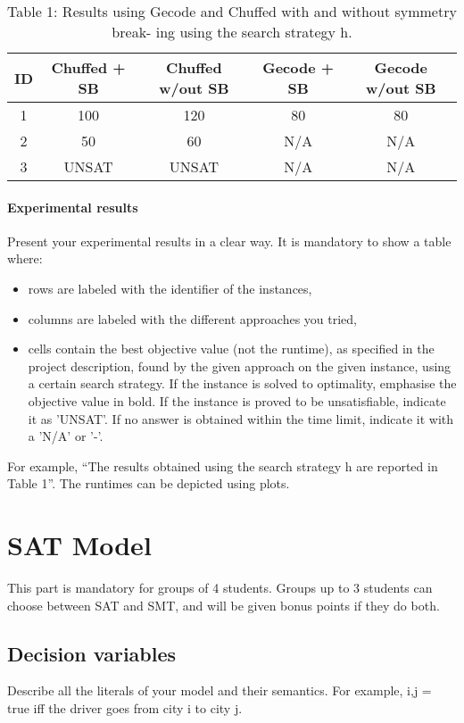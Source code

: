 \documentclass{article}
\begin{document}
\begin{table}[H]
    \centering
    \begin{tabular}{ccccc}
         ID \vline& Chuffed + SB & Chuffed w/out SB & Gecode + SB & Gecode w/out SB \\\hline
         1  \vline& 100 & 120 & 80 & 80\\
         2  \vline& 50 & 60 & N/A & N/A \\
         3  \vline& UNSAT & UNSAT & N/A & N/A \\
    \end{tabular}
    \caption{Table 1: Results using Gecode and Chuffed with and without symmetry break- ing using the search strategy h.}
    \label{tab:my_label}
\end{table}


\paragraph{Experimental results}
Present your experimental results in a clear way. It is mandatory to show a table where:
\begin{itemize}
    \item rows are labeled with the identifier of the instances,
    \item columns are labeled with the different approaches you tried,
    \item cells contain the best objective value (not the runtime), as specified in the project description, found by the given approach on the given instance, using a certain search strategy. If the instance is solved to optimality, emphasise the objective value in bold. If the instance is proved to be unsatisfiable, indicate it as ’UNSAT’. If no answer is obtained within the time limit, indicate it with a ’N/A’ or ’-’.
\end{itemize}

For example, “The results obtained using the search strategy h are reported in Table 1”. The runtimes can be depicted using plots.


\section{SAT Model}
This part is mandatory for groups of 4 students. Groups up to 3 students can choose between SAT and SMT, and will be given bonus points if they do both.

\subsection{Decision variables}
Describe all the literals of your model and their semantics. For example, i,j = true iff the driver goes from city i to city j.
\end{document}
